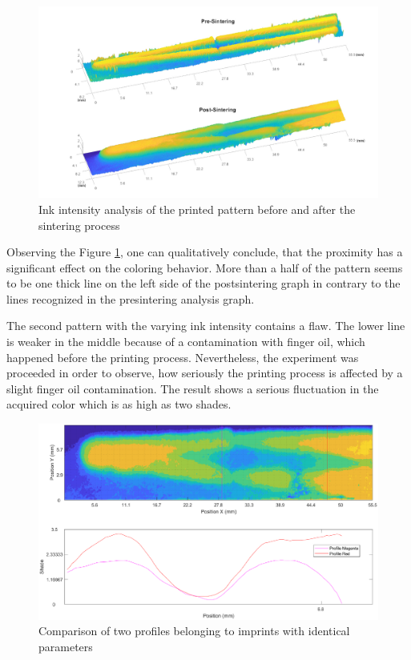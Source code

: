 \begin{figure}[H]
	\centering
	\includegraphics[width=1\textwidth]{grafiken/prepostV.jpg}
	\caption{Ink intensity analysis of the printed pattern before and after the sintering process}
	\label{fig:prepostV}
\end{figure} 

\bigskip

Observing the Figure \ref{fig:prepostV}, one can qualitatively conclude, that the proximity has a significant effect on the coloring behavior. More than a half of the pattern seems to be one thick line on the left side of the postsintering graph in contrary to the lines recognized in the presintering analysis graph. 

The second pattern with the varying ink intensity contains a flaw. The lower line is weaker in the middle because of a contamination with finger oil, which happened before the printing process. Nevertheless, the experiment was proceeded in order to observe, how seriously the printing process is affected by a slight finger oil contamination. The result shows a serious fluctuation in the acquired color which is as high as two shades. 



\bigskip

\begin{figure}[H]
	\centering
	\includegraphics[width=1\textwidth]{grafiken/vmatch.eps}
	\caption{Comparison of two profiles belonging to imprints with identical parameters}
	\label{fig:vmatch}
\end{figure} 

